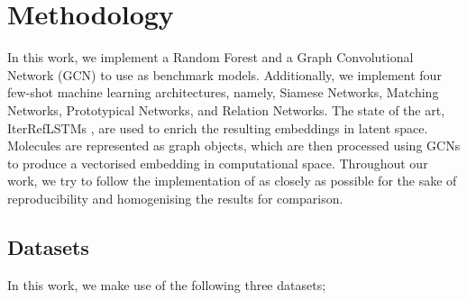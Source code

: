 \section{Methodology}


In this work, we implement a Random Forest and a Graph Convolutional Network (GCN) to use as benchmark models. Additionally, we implement four few-shot machine learning architectures, namely, Siamese Networks, Matching Networks, Prototypical Networks, and Relation Networks. The state of the art, IterRefLSTMs \citep{altae2017low}, are used to enrich the resulting embeddings in latent space. Molecules are represented as graph objects, which are then processed using GCNs to produce a vectorised embedding in computational space. Throughout our work, we try to follow the implementation of \citet{altae2017low} as closely as possible for the sake of reproducibility and homogenising the results for comparison.


\subsection{Datasets}

In this work, we make use of the following three datasets;

